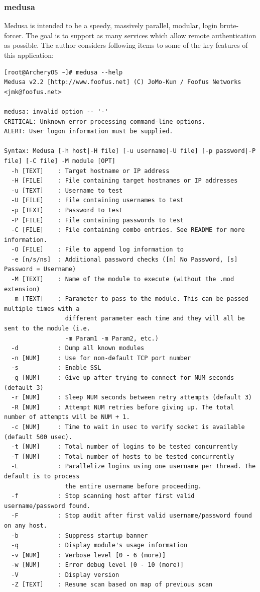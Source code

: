 \documentclass{article}
\begin{document}
\subsubsection{medusa}
Medusa is intended to be a speedy, massively parallel,  modular,  login brute-forcer.   The  goal  is  to  support as many services which allow remote authentication as possible. The author considers following items to some of the key features of this application:
\begin{lstlisting}
[root@ArcheryOS ~]# medusa --help
Medusa v2.2 [http://www.foofus.net] (C) JoMo-Kun / Foofus Networks <jmk@foofus.net>

medusa: invalid option -- '-'
CRITICAL: Unknown error processing command-line options.
ALERT: User logon information must be supplied.

Syntax: Medusa [-h host|-H file] [-u username|-U file] [-p password|-P file] [-C file] -M module [OPT]
  -h [TEXT]    : Target hostname or IP address
  -H [FILE]    : File containing target hostnames or IP addresses
  -u [TEXT]    : Username to test
  -U [FILE]    : File containing usernames to test
  -p [TEXT]    : Password to test
  -P [FILE]    : File containing passwords to test
  -C [FILE]    : File containing combo entries. See README for more information.
  -O [FILE]    : File to append log information to
  -e [n/s/ns]  : Additional password checks ([n] No Password, [s] Password = Username)
  -M [TEXT]    : Name of the module to execute (without the .mod extension)
  -m [TEXT]    : Parameter to pass to the module. This can be passed multiple times with a
                 different parameter each time and they will all be sent to the module (i.e.
                 -m Param1 -m Param2, etc.)
  -d           : Dump all known modules
  -n [NUM]     : Use for non-default TCP port number
  -s           : Enable SSL
  -g [NUM]     : Give up after trying to connect for NUM seconds (default 3)
  -r [NUM]     : Sleep NUM seconds between retry attempts (default 3)
  -R [NUM]     : Attempt NUM retries before giving up. The total number of attempts will be NUM + 1.
  -c [NUM]     : Time to wait in usec to verify socket is available (default 500 usec).
  -t [NUM]     : Total number of logins to be tested concurrently
  -T [NUM]     : Total number of hosts to be tested concurrently
  -L           : Parallelize logins using one username per thread. The default is to process 
                 the entire username before proceeding.
  -f           : Stop scanning host after first valid username/password found.
  -F           : Stop audit after first valid username/password found on any host.
  -b           : Suppress startup banner
  -q           : Display module's usage information
  -v [NUM]     : Verbose level [0 - 6 (more)]
  -w [NUM]     : Error debug level [0 - 10 (more)]
  -V           : Display version
  -Z [TEXT]    : Resume scan based on map of previous scan
\end{lstlisting}
\end{document}
